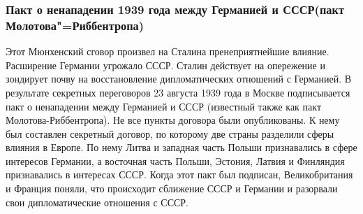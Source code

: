 \subsubsection{\textbf{Пакт о ненападении 1939 года между Германией и СССР(пакт Молотова"=Риббентропа)}}

Этот Мюнхенский сговор произвел на Сталина пренеприятнейшие влияние. Расширение Германии угрожало СССР. Сталин действует на опережение и зондирует почву на восстановление дипломатических отношений с Германией. В результате секретных переговоров 23 августа 1939 года в Москве подписывается пакт о ненападении между Германией и СССР (известный также как пакт Молотова-Риббентропа). Не все пункты договора были опубликованы. К нему был составлен секретный договор, по которому две страны разделили сферы влияния в Европе. По нему Литва и западная часть Польши признавались в сфере интересов Германии, а восточная часть Польши, Эстония, Латвия и Финляндия признавались в интересах СССР. Когда этот пакт был подписан, Великобритания и Франция поняли, что происходит сближение СССР и Германии и разорвали свои дипломатические отношения с СССР.

